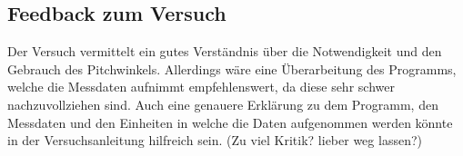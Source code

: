 \subsection{Feedback zum Versuch}

Der Versuch vermittelt ein gutes Verständnis über die Notwendigkeit und den Gebrauch des Pitchwinkels. Allerdings wäre eine Überarbeitung des Programms, welche die Messdaten aufnimmt 
empfehlenswert, da diese sehr schwer nachzuvollziehen sind. Auch eine genauere Erklärung zu dem Programm, den Messdaten und den Einheiten in welche die Daten aufgenommen werden könnte in der Versuchsanleitung hilfreich sein.
(Zu viel Kritik? lieber weg lassen?)